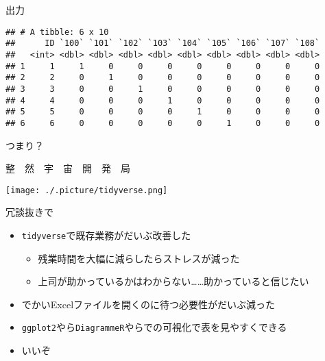 \documentclass[ignorenonframetext,]{beamer}
\newenvironment{Shaded}{\begin{snugshade}}{\end{snugshade}}
\newcommand{\DecValTok}[1]{\textcolor[rgb]{0.00,0.00,0.81}{#1}}
\newcommand{\NormalTok}[1]{#1}
\newcommand{\OperatorTok}[1]{\textcolor[rgb]{0.81,0.36,0.00}{\textbf{#1}}}
\newcommand{\StringTok}[1]{\textcolor[rgb]{0.31,0.60,0.02}{#1}}
\providecommand{\tightlist}{%
  \setlength{\itemsep}{0pt}\setlength{\parskip}{0pt}}
\begin{document}
\begin{frame}[fragile]{出力}

\begin{Shaded}
\end{Shaded}

\begin{verbatim}
## # A tibble: 6 x 10
##      ID `100` `101` `102` `103` `104` `105` `106` `107` `108`
##   <int> <dbl> <dbl> <dbl> <dbl> <dbl> <dbl> <dbl> <dbl> <dbl>
## 1     1     1     0     0     0     0     0     0     0     0
## 2     2     0     1     0     0     0     0     0     0     0
## 3     3     0     0     1     0     0     0     0     0     0
## 4     4     0     0     0     1     0     0     0     0     0
## 5     5     0     0     0     0     1     0     0     0     0
## 6     6     0     0     0     0     0     1     0     0     0
\end{verbatim}

\end{frame}

\begin{frame}{つまり？}

\begin{block}{整　然　宇　宙　開　発　局}

\texttt{[image: ./.picture/tidyverse.png]}

\end{block}

\end{frame}

\begin{frame}[fragile]{冗談抜きで}

\begin{itemize}
\tightlist
\item
  \texttt{tidyverse}で既存業務がだいぶ改善した

  \begin{itemize}
  \tightlist
  \item
    残業時間を大幅に減らしたらストレスが減った
  \item
    上司が助かっているかはわからない\ldots{}\ldots{}助かっていると信じたい
  \end{itemize}
\item
  でかいExcelファイルを開くのに待つ必要性がだいぶ減った
\item
  \texttt{ggplot2}やら\texttt{DiagrammeR}やらでの可視化で表を見やすくできる
\item
  いいぞ
\end{itemize}

\end{frame}
\end{document}
